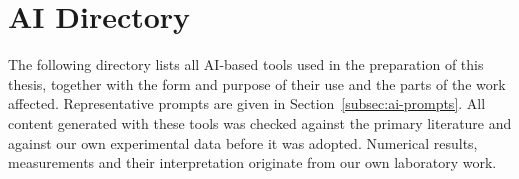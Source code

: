 %

\section{AI Directory}
\label{sec:ai-directory}

The following directory lists all AI-based tools used in the preparation of this
thesis, together with the form and purpose of their use and the parts of the work
affected. Representative prompts are given in Section~\ref{subsec:ai-prompts}. All
content generated with these tools was checked against the primary literature and
against our own experimental data before it was adopted. Numerical results,
measurements and their interpretation originate from our own laboratory work.

